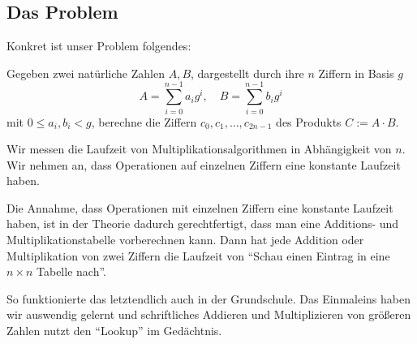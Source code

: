 
\subsection{Das Problem}

\begin{remark}
    Konkret ist unser Problem folgendes:

    \medskip
    Gegeben zwei natürliche Zahlen $A,B$, dargestellt durch ihre $n$ Ziffern in Basis $g$
    \[A=\sum_{i=0}^{n-1} a_i g^i,\quad B=\sum_{i=0}^{n-1} b_i g^i\]
    mit $0\leq a_i,b_i<g$, berechne die Ziffern $c_0, c_1, \ldots, c_{2n-1}$ des Produkts $C:=A\cdot B$.

    \medskip
    Wir messen die Laufzeit von Multiplikationsalgorithmen in Abhängigkeit von $n$. Wir nehmen an, dass Operationen auf einzelnen Ziffern eine konstante Laufzeit haben.
\end{remark}

\begin{remark}
    Die Annahme, dass Operationen mit einzelnen Ziffern eine konstante Laufzeit haben, ist in der Theorie dadurch gerechtfertigt, dass man eine Additions- und Multiplikationstabelle vorberechnen kann. Dann hat jede Addition oder Multiplikation von zwei Ziffern die Laufzeit von \enquote{Schau einen Eintrag in eine $n\times n$ Tabelle nach}.

    So funktionierte das letztendlich auch in der Grundschule. Das Einmaleins haben wir auswendig gelernt und schriftliches Addieren und Multiplizieren von größeren Zahlen nutzt den \enquote{Lookup} im Gedächtnis.
\end{remark}

